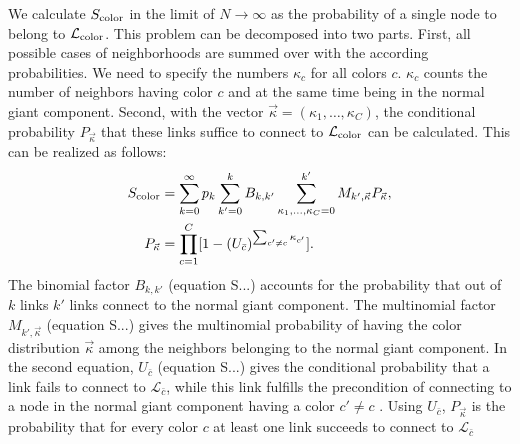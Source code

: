 \documentclass[aps, pre, twocolumn, a4paper, floatfix]{revtex4}
\begin{document}
We calculate $S_{\rm color}$ in the limit of $N\to \infty$ as the probability of a 
single node to belong to $\mathcal{L}_{\rm color}$. This problem can be decomposed into two parts. 
First, all possible cases of neighborhoods are summed over with the according 
probabilities. We need to specify the numbers $\kappa_c$ for all colors $c$. $\kappa_c$ 
counts the number of neighbors having color $c$ and at the same time being in the normal
giant component. Second, with the vector ${\vec \kappa}=(\kappa_1,\dots,\kappa_C)$, the conditional 
probability $P_{\vec \kappa}$ that these links suffice to connect to $\mathcal{L}_{\rm color}$ can 
be calculated. This can be realized as follows:
\begin{align}
S_{\rm color} &= \sum_{k=0}^{\infty}p_k \sum_{k'=0}^{k} B_{k,k'} 
\sum_{\kappa_1,\dots, \kappa_C=0}^{k'} M_{k',\vec \kappa} 
P_{\vec \kappa},\label{eq:s_color}\\
P_{\vec \kappa} &= \prod_{c=1}^C [1-(U_{\bar c})^{\sum_{c'\neq c} \kappa_{c'} }].
\end{align}
The binomial factor $B_{k,k'}$ (equation S...) accounts for the probability that out of 
$k$ links $k'$ links connect to the normal giant component. The multinomial factor 
$M_{k',\vec \kappa}$ (equation S...) gives the multinomial probability of having the color 
distribution ${\vec \kappa}$ among the neighbors belonging to the normal giant component. 
In the second equation, $U_{\bar c}$ (equation S...) gives the conditional probability that a link 
fails to connect to $\mathcal{L}_{\bar c}$, while this 
link fulfills the precondition of connecting to a node in the normal giant component 
having a color $c'\neq c$ . Using $U_{\bar c}$, $P_{\vec \kappa}$ is the probability that for every 
color $c$ at least one link succeeds to connect to $\mathcal{L}_{\bar c}$
\end{document}
